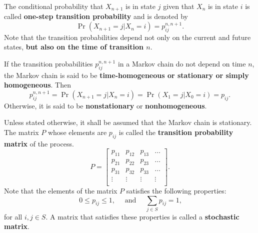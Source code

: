\documentclass[
]{book}
\theoremstyle{definition}
\theoremstyle{definition}
\theoremstyle{definition}
\theoremstyle{definition}
\theoremstyle{remark}
\begin{document}
The conditional probability that \(X_{n+1}\) is in state \(j\) given that
\(X_n\) is in state \(i\) is called \textbf{one-step transition probability} and
is denoted by \[\Pr(X_{n+1} = j | X_n = i) = p_{ij}^{n,n+1}.\] Note that
the transition probabilities depend not only on the current and future
states, \textbf{but also on the time of transition \(n\)}.

If the transition probabilities \(p_{ij}^{n,n+1}\) in a Markov chain do
not depend on time \(n\), the Markov chain is said to be
\textbf{time-homogeneous or stationary or simply homogeneous}. Then
\[p_{ij}^{n,n+1} = \Pr(X_{n+1} = j | X_n = i)  = \Pr(X_{1} = j | X_0 = i)  = p_{ij}.\]
Otherwise, it is said to be \textbf{nonstationary} or \textbf{nonhomogeneous}.

Unless stated otherwise, it shall be assumed that the Markov chain is
stationary. The matrix \(P\) whose elements are \(p_{ij}\) is called the
\textbf{transition probability matrix} of the process. \[P = \begin{bmatrix}
    p_{11} & p_{12} & p_{13} & \dots   \\
    p_{21} & p_{22} & p_{23} & \dots   \\
    p_{31} & p_{32} & p_{33} & \dots   \\
    \vdots & \vdots & \vdots  & \vdots \\
\end{bmatrix}.\] Note that the elements of the matrix \(P\) satisfies the
following properties:
\[\ 0 \le p_{ij} \le 1, \quad \text{ and } \quad \sum_{j \in S}p_{ij} = 1,\]
for all \(i,j \in S.\) A matrix that satisfies these properties is called
a \textbf{stochastic matrix}.
\end{document}
